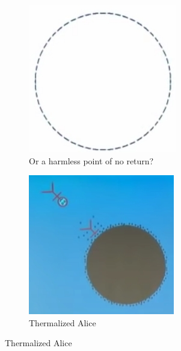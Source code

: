 \documentclass[]{article}
\begin{document}
{\begin{appendices}
\begin{figure}[H]
\begin{center}
\begin{subfigure}[t]{0.2\textwidth}
			\end{subfigure}
			\;
			\begin{subfigure}[t]{0.2\textwidth}
				\caption{Or a harmless point of no return?}
				\includegraphics[width=\textwidth]{wh-or-harmless}
			\end{subfigure}
			\begin{subfigure}[t]{0.2\textwidth}
				\caption{Thermalized Alice}
				\includegraphics[width=\textwidth]{wh-thermal-alice}
			\end{subfigure}
		\end{center}
	\end{figure}


\end{appendices}}
\end{document}
